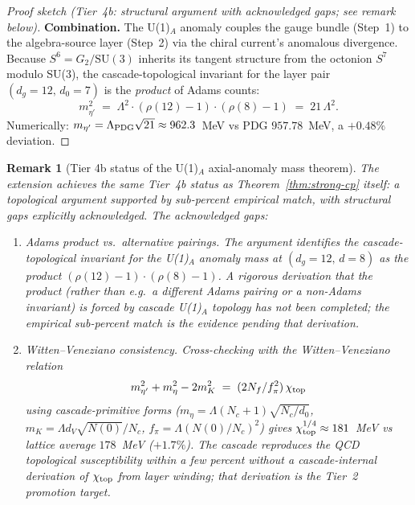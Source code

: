 \documentclass[12pt,a4paper]{article}
\newtheorem*{remark}{Remark}
\begin{document}
\begin{proof}[Proof sketch (Tier~4b: structural argument with acknowledged gaps; see remark below)]
\textbf{Combination.} The U(1)$_{\!A}$ anomaly couples the gauge bundle (Step~1) to the algebra-source layer (Step~2) via the chiral current's anomalous divergence. Because $S^6 = G_2/\mathrm{SU}(3)$ inherits its tangent structure from the octonion $S^7$ modulo SU(3), the cascade-topological invariant for the layer pair $(d_g=12,\,d_0=7)$ is the \emph{product} of Adams counts:
\[
m_{\eta'}^2 \;=\; \Lambda^2 \cdot (\rho(12)-1) \cdot (\rho(8)-1) \;=\; 21\,\Lambda^2.
\]
Numerically: $m_{\eta'} = \Lambda_{\rm PDG}\sqrt{21} \approx 962.3$~MeV vs PDG $957.78$~MeV, a $+0.48\%$ deviation.
\end{proof}

\begin{remark}[Tier 4b status of the U(1)$_A$ axial-anomaly mass theorem]\label{rem:axial-anomaly-mass-tier}
The extension achieves the same Tier~4b status as Theorem~\ref{thm:strong-cp} itself: a topological argument supported by sub-percent empirical match, with structural gaps explicitly acknowledged. The acknowledged gaps:
\begin{enumerate}
\item \emph{Adams product vs.\ alternative pairings.} The argument identifies the cascade-topological invariant for the U(1)$_{\!A}$ anomaly mass at $(d_g=12,\,d=8)$ as the \emph{product} $(\rho(12)-1)\cdot(\rho(8)-1)$. A rigorous derivation that the product (rather than e.g.\ a different Adams pairing or a non-Adams invariant) is forced by cascade U(1)$_{\!A}$ topology has not been completed; the empirical sub-percent match is the evidence pending that derivation.
\item \emph{Witten--Veneziano consistency.} Cross-checking with the Witten--Veneziano relation
\[
m_{\eta'}^2 + m_\eta^2 - 2m_K^2 \;=\; (2 N_f / f_\pi^2)\,\chi_{\rm top}
\]
using cascade-primitive forms ($m_\eta = \Lambda(N_c+1)\sqrt{N_c/d_0}$, $m_K = \Lambda d_V\sqrt{N(0)}/N_c$, $f_\pi = \Lambda(N(0)/N_c)^2$) gives $\chi_{\rm top}^{1/4} \approx 181$~MeV vs lattice average $178$~MeV ($+1.7\%$). The cascade reproduces the QCD topological susceptibility within a few percent without a cascade-internal derivation of $\chi_{\rm top}$ from layer winding; that derivation is the Tier~2 promotion target.

\end{enumerate}
\end{remark}
\end{document}
